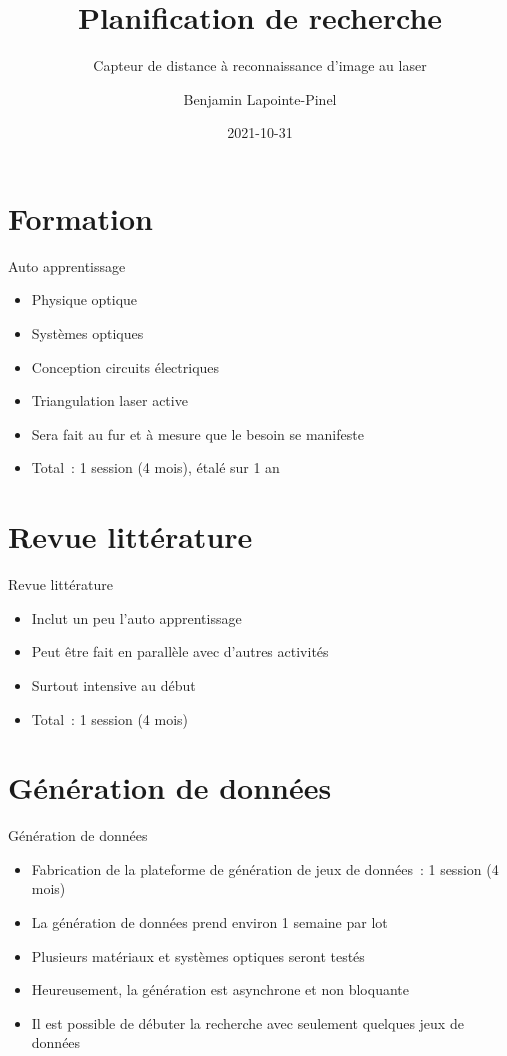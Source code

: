 \documentclass{beamer}
\title{Planification de recherche}
\subtitle{Capteur de distance à reconnaissance d'image au laser}
\author{Benjamin Lapointe-Pinel}
\institute{UQAR}
\date{2021-10-31}
\begin{document}
\frame{\titlepage}


\section{Formation}
\begin{frame}{Auto apprentissage}
	\begin{itemize}
		\item Physique optique
		\item Systèmes optiques
		\item Conception circuits électriques
		\item Triangulation laser active
		\item Sera fait au fur et à mesure que le besoin se manifeste
		\item Total~: 1 session (4 mois), étalé sur 1 an
	\end{itemize}
\end{frame}

\section{Revue littérature}
\begin{frame}{Revue littérature}
	\begin{itemize}
		\item Inclut un peu l'auto apprentissage
		\item Peut être fait en parallèle avec d'autres activités
		\item Surtout intensive au début
		\item Total~: 1 session (4 mois)
	\end{itemize}
\end{frame}

\section{Génération de données}
\begin{frame}{Génération de données}
	\begin{itemize}
		\item Fabrication de la plateforme de génération de jeux de données~: 1 session (4 mois)
		\item La génération de données prend environ 1 semaine par lot
		\item Plusieurs matériaux et systèmes optiques seront testés
		\item Heureusement, la génération est asynchrone et non bloquante
		\item Il est possible de débuter la recherche avec seulement quelques jeux de données
	\end{itemize}
\end{frame}
\end{document}
